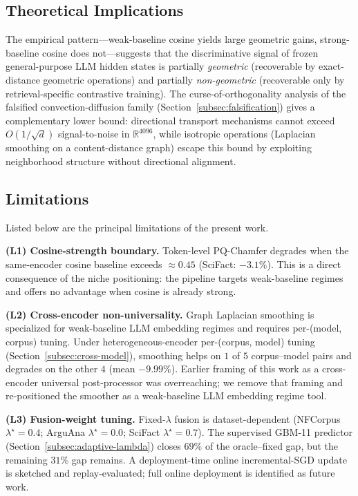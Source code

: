 \documentclass[review,1p]{elsarticle}
\newcommand{\R}{\mathbb{R}}
\begin{document}
\subsection{Theoretical Implications}

The empirical pattern---weak-baseline cosine yields large geometric gains, strong-baseline cosine does not---suggests that the discriminative signal of frozen general-purpose LLM hidden states is partially \emph{geometric} (recoverable by exact-distance geometric operations) and partially \emph{non-geometric} (recoverable only by retrieval-specific contrastive training). The curse-of-orthogonality analysis of the falsified convection-diffusion family (Section~\ref{subsec:falsification}) gives a complementary lower bound: directional transport mechanisms cannot exceed $O(1/\sqrt{d})$ signal-to-noise in $\R^{4096}$, while isotropic operations (Laplacian smoothing on a content-distance graph) escape this bound by exploiting neighborhood structure without directional alignment.

\subsection{Limitations}
\label{subsec:limitations}

Listed below are the principal limitations of the present work.

\textbf{(L1) Cosine-strength boundary.} Token-level PQ-Chamfer degrades when the same-encoder cosine baseline exceeds $\approx 0.45$ (SciFact: $-3.1\%$). This is a direct consequence of the niche positioning: the pipeline targets weak-baseline regimes and offers no advantage when cosine is already strong.

\textbf{(L2) Cross-encoder non-universality.} Graph Laplacian smoothing is specialized for weak-baseline LLM embedding regimes and requires per-(model, corpus) tuning. Under heterogeneous-encoder per-(corpus, model) tuning (Section~\ref{subsec:cross-model}), smoothing helps on $1$ of $5$ corpus--model pairs and degrades on the other $4$ (mean $-9.99\%$). Earlier framing of this work as a cross-encoder universal post-processor was overreaching; we remove that framing and re-positioned the smoother as a weak-baseline LLM embedding regime tool.

\textbf{(L3) Fusion-weight tuning.} Fixed-$\lambda$ fusion is dataset-dependent (NFCorpus $\lambda^\star=0.4$; ArguAna $\lambda^\star=0.0$; SciFact $\lambda^\star=0.7$). The supervised GBM-11 predictor (Section~\ref{subsec:adaptive-lambda}) closes $69\%$ of the oracle--fixed gap, but the remaining $31\%$ gap remains. A deployment-time online incremental-SGD update is sketched and replay-evaluated; full online deployment is identified as future work.
\end{document}
